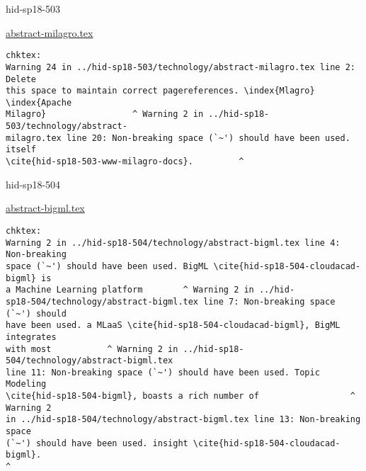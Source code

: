 

\begin{IU}

hid-sp18-503

\href{https://github.com/cloudmesh-community/hid-sp18-503/blob/master//technology/abstract-milagro.tex}{abstract-milagro.tex}

\begin{tiny}
\begin{verbatim}
chktex:
Warning 24 in ../hid-sp18-503/technology/abstract-milagro.tex line 2: Delete
this space to maintain correct pagereferences. \index{Mlagro} \index{Apache
Milagro}                 ^ Warning 2 in ../hid-sp18-503/technology/abstract-
milagro.tex line 20: Non-breaking space (`~') should have been used. itself
\cite{hid-sp18-503-www-milagro-docs}.         ^
\end{verbatim}
\end{tiny}
\end{IU}



\begin{IU}

hid-sp18-504

\href{https://github.com/cloudmesh-community/hid-sp18-504/blob/master//technology/abstract-bigml.tex}{abstract-bigml.tex}

\begin{tiny}
\begin{verbatim}
chktex:
Warning 2 in ../hid-sp18-504/technology/abstract-bigml.tex line 4: Non-breaking
space (`~') should have been used. BigML \cite{hid-sp18-504-cloudacad-bigml} is
a Machine Learning platform        ^ Warning 2 in ../hid-
sp18-504/technology/abstract-bigml.tex line 7: Non-breaking space (`~') should
have been used. a MLaaS \cite{hid-sp18-504-cloudacad-bigml}, BigML integrates
with most           ^ Warning 2 in ../hid-sp18-504/technology/abstract-bigml.tex
line 11: Non-breaking space (`~') should have been used. Topic Modeling
\cite{hid-sp18-504-bigml}, boasts a rich number of                  ^ Warning 2
in ../hid-sp18-504/technology/abstract-bigml.tex line 13: Non-breaking space
(`~') should have been used. insight \cite{hid-sp18-504-cloudacad-bigml}.
^
\end{verbatim}
\end{tiny}
\end{IU}



